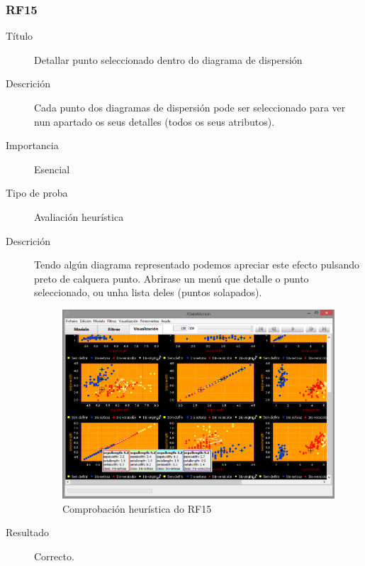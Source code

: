 \subsubsection*{RF15}
\begin{description}
\item[Título] \hfill
Detallar punto seleccionado dentro do diagrama de dispersión
\item[Descrición] \hfill
Cada punto dos diagramas de dispersión pode ser seleccionado para ver nun apartado os seus detalles (todos os seus atributos).
\item[Importancia] \hfill
Esencial
\item[Tipo de proba] \hfill
Avaliación heurística
\item[Descrición]
Tendo algún diagrama representado podemos apreciar este efecto pulsando preto de calquera punto. Abrirase un menú que detalle o punto seleccionado, ou unha lista deles (puntos solapados).
\begin{figure}
\centering
\includegraphics[width=\textwidth,height=\textheight,keepaspectratio]{figuras/RF1516}
\caption{Comprobación heurística do RF15}
\label{RF1516}
\end{figure}
\item[Resultado]
Correcto.
\end{description}

